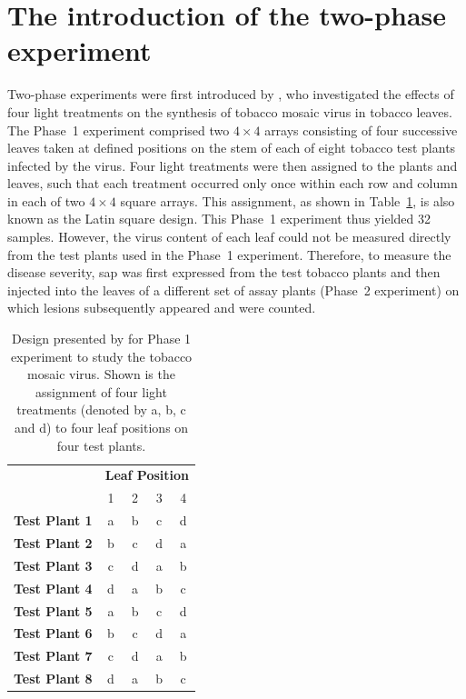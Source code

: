 \section{The introduction of the two-phase experiment}
\label{sec:introTwoPhase}
Two-phase experiments were first introduced by \cite{McIntyre1955}, who investigated the effects of four light treatments on the synthesis of tobacco mosaic virus in tobacco leaves. The Phase~1 experiment comprised two $4 \times 4$ arrays consisting of four successive leaves taken at defined positions on the stem of each of eight tobacco test plants infected by the virus. Four light treatments were then assigned to the plants and leaves, such that each treatment occurred only once within each row and column in each of two $4 \times 4$ square arrays. This assignment, as shown in Table~\ref{tab:Phase1McIntyre}, is also known as the Latin square design. This Phase~1 experiment thus yielded 32 samples. However, the virus content of each leaf could not be measured directly from the test plants used in the Phase~1 experiment. Therefore, to measure the disease severity, sap was first expressed from the test tobacco plants and then injected into the leaves of a different set of assay plants (Phase~2 experiment) on which lesions subsequently appeared and were counted. 

\begin{table}[ht]
\centering
\caption{Design presented by \cite{McIntyre1955} for Phase 1 experiment to study the tobacco mosaic virus. Shown is the assignment of four light treatments (denoted by a, b, c and d) to four leaf positions on four test plants.}
\begin{tabular}[t]{|c|cccc|}  \hline
& \multicolumn{4}{r|}{\textbf{Leaf Position}}\\
& 1 & 2 & 3 & 4\\\hline
{\bf Test Plant 1} & a & b & c & d \\ \hline
{\bf Test Plant 2} & b & c & d & a \\ \hline
{\bf Test Plant 3} & c & d & a & b  \\ \hline
{\bf Test Plant 4} & d & a & b & c \\ \hline
{\bf Test Plant 5} & a & b & c & d \\ \hline
{\bf Test Plant 6} & b & c & d & a \\ \hline
{\bf Test Plant 7} & c & d & a & b  \\ \hline
{\bf Test Plant 8} & d & a & b & c \\ \hline
\end{tabular} 
\label{tab:Phase1McIntyre}
\end{table}


